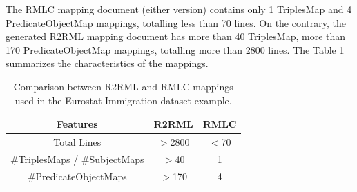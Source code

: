 The RMLC mapping document (either version) contains only 1 TriplesMap and 4 PredicateObjectMap mappings, totalling less than 70 lines. On the contrary, the generated R2RML mapping document has more than 40 TriplesMap, more than 170 PredicateObjectMap mappings, totalling more than 2800 lines. The Table \ref{table:compare2} summarizes the characteristics of the mappings.
\begin{table}[tbp]
\caption{Comparison between R2RML and RMLC mappings used in the Eurostat Immigration dataset example.}
\label{table:compare2}
\begin{tabular}{c|c|c}
\hline
\textbf{Features} & \textbf{R2RML}   & \textbf{RMLC}  \\ \hline
Total Lines   & $>$2800 & $<$70 \\ 
\#TriplesMaps / \#SubjectMaps     & $>$40                & 1           \\
\#PredicateObjectMaps  & $>$170              & 4            \\ \hline
\end{tabular}
\end{table}